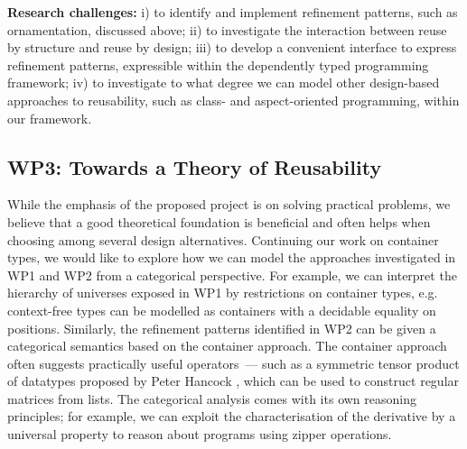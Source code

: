 \documentclass[a4paper]{article}
\begin{document}
\textbf{Research challenges:} i) to identify and implement refinement
patterns, such as ornamentation, discussed above; ii) to
investigate the interaction between reuse by structure and reuse by
design; iii) to develop a convenient interface to express refinement
patterns, expressible within the dependently typed programming
framework; iv) to investigate to what degree we can model other
design-based approaches to reusability, such as class- and
aspect-oriented programming, within our framework.








\subsection*{WP3: Towards a Theory of Reusability}
\label{sec:theory}

While the emphasis of the proposed project is on solving practical
problems, we believe that a good theoretical foundation is beneficial
and often helps when choosing among several design
alternatives. Continuing our work on container types, we would like to
explore how we can model the approaches investigated in WP1 and WP2
from a categorical perspective. For example, we can interpret the
hierarchy of universes exposed in WP1 by restrictions on container
types, e.g. context-free types can be modelled as containers with a
decidable equality on positions. Similarly, the refinement patterns
identified in WP2 can be given a categorical semantics based on the
container approach. The container approach often suggests practically
useful operators~--- such as a symmetric tensor product of datatypes
proposed by Peter Hancock \cite{hank:tensor}, which can be used to
construct regular matrices from lists. The categorical analysis comes
with its own reasoning principles; for example, we can exploit the
characterisation of the derivative by a universal property to reason
about programs using zipper operations.
\end{document}
